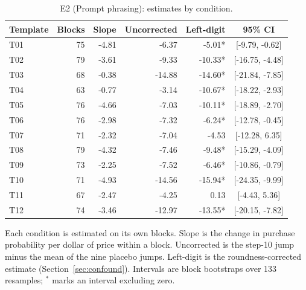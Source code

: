 \begin{table}[t]
\centering
\caption{E2 (Prompt phrasing): estimates by condition.}
\label{tab:e2cond}
\small
\begin{tabular}{lrrrrc}
\toprule
Template & Blocks & Slope & Uncorrected & Left-digit & 95\% CI \\
\midrule
T01 & 75 & -4.81 & -6.37 & -5.01* & [-9.79, -0.62] \\
T02 & 79 & -3.61 & -9.33 & -10.33* & [-16.75, -4.48] \\
T03 & 68 & -0.38 & -14.88 & -14.60* & [-21.84, -7.85] \\
T04 & 63 & -0.77 & -3.14 & -10.67* & [-18.22, -2.93] \\
T05 & 76 & -4.66 & -7.03 & -10.11* & [-18.89, -2.70] \\
T06 & 76 & -2.98 & -7.32 & -6.24* & [-12.78, -0.45] \\
T07 & 71 & -2.32 & -7.04 & -4.53 & [-12.28, 6.35] \\
T08 & 79 & -4.32 & -7.46 & -9.48* & [-15.29, -4.09] \\
T09 & 73 & -2.25 & -7.52 & -6.46* & [-10.86, -0.79] \\
T10 & 71 & -4.93 & -14.56 & -15.94* & [-24.35, -9.99] \\
T11 & 67 & -2.47 & -4.25 & 0.13 & [-4.43, 5.36] \\
T12 & 74 & -3.46 & -12.97 & -13.55* & [-20.15, -7.82] \\
\bottomrule
\end{tabular}
\vspace{2pt}
\parbox{\linewidth}{\footnotesize Each condition is estimated on its own blocks. Slope is the change in purchase probability per dollar of price within a block. Uncorrected is the step-10 jump minus the mean of the nine placebo jumps. Left-digit is the roundness-corrected estimate (Section~\ref{sec:confound}). Intervals are block bootstraps over 133 resamples; $^{*}$ marks an interval excluding zero.}
\end{table}
